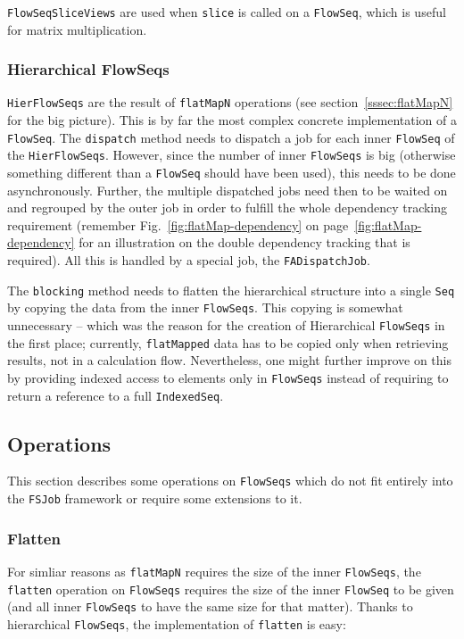 \documentclass[runningheads,a4paper,fleqn]{llncs}
\begin{document}
\texttt{FlowSeqSliceViews} are used when \texttt{slice} is called on
a \texttt{FlowSeq}, which is useful for matrix multiplication.

\subsubsection{Hierarchical FlowSeqs}
\texttt{HierFlowSeqs} are the result of \texttt{flatMapN} operations
(see section~\ref{sssec:flatMapN} for the big picture). This is by far
the most complex concrete implementation of a \texttt{FlowSeq}. The
\texttt{dispatch} method needs to dispatch a job for each inner
\texttt{FlowSeq} of the \texttt{HierFlowSeqs}. However, since the number of
inner \texttt{FlowSeqs} is big (otherwise something different than a \texttt{FlowSeq}
should have been used), 
this needs to be done asynchronously. Further, the multiple dispatched
jobs need then to be waited on and regrouped by the outer job in order
to fulfill the whole dependency tracking requirement (remember
Fig.~\ref{fig:flatMap-dependency} on
page~\ref{fig:flatMap-dependency} for an illustration on the
double dependency tracking that is required). All this is handled by a 
special job, the \texttt{FADispatchJob}.

The \texttt{blocking} method needs to flatten the hierarchical
structure into a single \texttt{Seq} by copying the data from the
inner \texttt{FlowSeqs}. This copying is somewhat unnecessary -- which
was the reason for the creation of Hierarchical \texttt{FlowSeqs} in the
first place; currently, \texttt{flatMapped} data has to be copied only when
retrieving results, not in a calculation flow. Nevertheless, one might
further improve on this by providing indexed access to elements only
in \texttt{FlowSeqs} instead of requiring to return a reference to a full
\texttt{IndexedSeq}.

\subsection{Operations}
\label{ssec:imp-operations}
This section describes some operations on \texttt{FlowSeqs} which do not fit
entirely into the \texttt{FSJob} framework or require some extensions
to it.

\subsubsection{Flatten}
For simliar reasons as \texttt{flatMapN} requires the size of the
inner \texttt{FlowSeqs}, the \texttt{flatten} operation on
\texttt{FlowSeqs} requires the size of the inner \texttt{FlowSeq} to
be given (and all inner \texttt{FlowSeqs} to have the same size for
that matter). Thanks to hierarchical \texttt{FlowSeqs}, the
implementation of \texttt{flatten} is easy:
\end{document}
